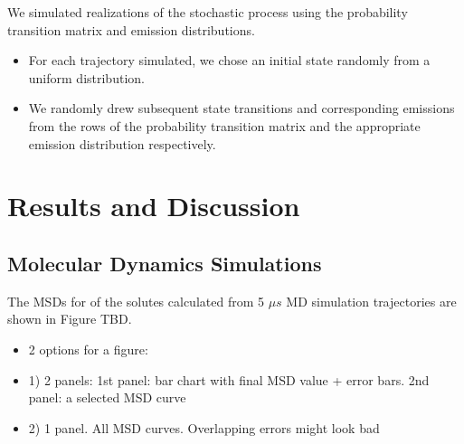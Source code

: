 \documentclass{article}
\begin{document}
  We simulated realizations of the stochastic process using the probability transition
  matrix and emission distributions.
  \begin{itemize}
    \item For each trajectory simulated, we chose an initial state randomly from a 
    uniform distribution. %
    \item We randomly drew subsequent state transitions and corresponding emissions 
    from the rows of the probability transition matrix and the appropriate emission
    distribution respectively.
  \end{itemize}
  

  \section{Results and Discussion}
  
  \subsection{Molecular Dynamics Simulations}\label{section:MD_simulations}
  
  The MSDs for of the solutes calculated from 5 $\mu s$ MD simulation trajectories
  are shown in Figure TBD.
  \begin{itemize}
    \item 2 options for a figure:
    \item 1) 2 panels: 1st panel: bar chart with final MSD value + error bars. 2nd panel: a selected MSD curve
    \item 2) 1 panel. All MSD curves. Overlapping errors might look bad
  \end{itemize}
  
\end{document}
